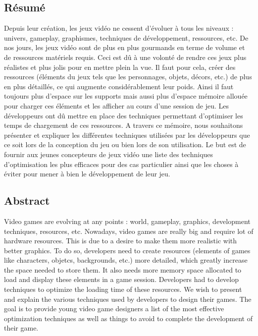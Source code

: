 \documentclass[a4paper, 12pt]{article} %
\begin{document}
\newpage

\subsection{Résumé}
Depuis leur création, les jeux vidéo ne cessent d'évoluer à tous les niveaux : univers, gameplay, graphismes, techniques de développement, ressources, etc. De nos jours, les jeux vidéo sont de plus en plus gourmands en terme de volume et de ressources matériels requis. Ceci est dû à une volonté de rendre ces jeux plus réalistes et plus jolis pour en mettre plein la vue. Il faut pour cela, créer des ressources (éléments du jeux tels que les personnages, objets, décors, etc.) de plus en plus détaillés, ce qui augmente considérablement leur poids. Ainsi il faut toujours plus d'espace sur les supports mais aussi plus d'espace mémoire allouée pour charger ces éléments et les afficher au cours d'une session de jeu. Les développeurs ont dû mettre en place des techniques permettant d'optimiser les temps de chargement de ces ressources. A travers ce mémoire, nous souhaitons présenter et expliquer les différentes techniques utilisées par les développeurs que ce soit lors de la conception du jeu ou bien lors de son utilisation. Le but est de fournir aux jeunes concepteurs de jeux vidéo une liste des techniques d'optimisation les plus efficaces pour des cas particulier ainsi que les choses à éviter pour mener à bien le développement de leur jeu.

\subsection{Abstract}
Video games are evolving at any points : world, gameplay, graphics, development techniques, resources, etc. Nowadays, video games are really big and require lot of hardware resources. This is due to a desire to make them more realistic with better graphics. To do so, developers need to create resources (elements of games like characters, objetcs, backgrounds, etc.) more detailed, which greatly increase the space needed to store them. It also needs more memory space allocated to load and display these elements in a game session. Developers had to develop techniques to optimize the loading time of these resources. We wish to present and explain the various techniques used by developers to design their games. The goal is to provide young video game designers a list of the most effective optimization techniques as well as things to avoid to complete the development of their game.
\end{document}
